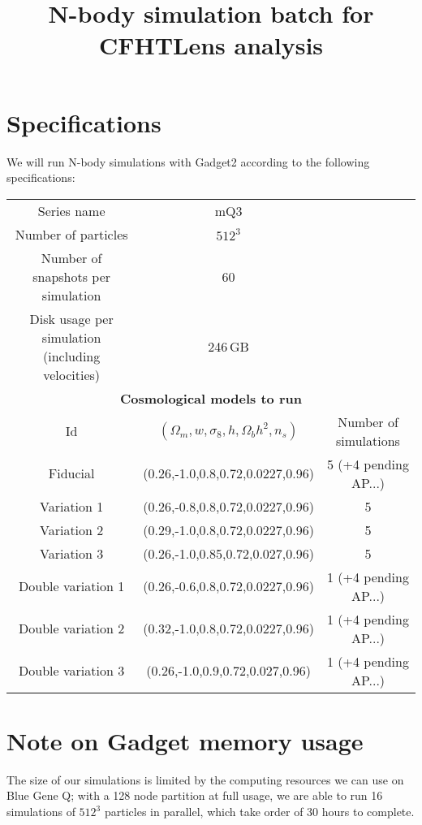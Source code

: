 \documentclass[11pt]{article}
\begin{document}
\title{N-body simulation batch for CFHTLens analysis}
\author{}
\date{}

\maketitle

\section*{Specifications}

We will run N-body simulations with Gadget2 according to the following specifications:

\begin{table}[h!]
\begin{center}
\begin{tabular}{ccc} \hline
Series name & mQ3 & \\
Number of particles & $512^3$ & \\ 
Number of snapshots per simulation & 60 & \\
Disk usage per simulation (including velocities) & 246\,GB& \\ \hline
\multicolumn{3}{c}{\textbf{Cosmological models to run}} \\
Id & $(\Omega_m,w,\sigma_8,h,\Omega_bh^2,n_s)$ & Number of simulations\\ \hline
Fiducial & (0.26,-1.0,0.8,0.72,0.0227,0.96) & 5 (+4 pending AP...) \\
Variation 1 & (0.26,-0.8,0.8,0.72,0.0227,0.96) & 5 \\
Variation 2 & (0.29,-1.0,0.8,0.72,0.0227,0.96) & 5 \\
Variation 3 & (0.26,-1.0,0.85,0.72,0.027,0.96) & 5 \\ \hline
Double variation 1 & (0.26,-0.6,0.8,0.72,0.0227,0.96) & 1 (+4 pending AP...) \\
Double variation 2 & (0.32,-1.0,0.8,0.72,0.0227,0.96) & 1 (+4 pending AP...) \\
Double variation 3 & (0.26,-1.0,0.9,0.72,0.027,0.96) & 1 (+4 pending AP...) \\ \hline
\end{tabular}
\end{center}
\end{table}

\section*{Note on Gadget memory usage}
The size of our simulations is limited by the computing resources we can use on Blue Gene Q; with a 128 node partition at full usage, we are able to run 16 simulations of $512^3$ particles in parallel, which take order of 30 hours to complete. 
\end{document}
